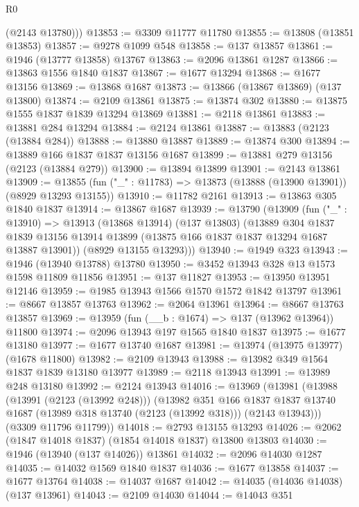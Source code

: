 \begin{lexlean}{R0}
\begin{coremodule}
        (@2143 @13780)))
@13853 := @3309 @11777 @11780
@13855 := @13808 (@13851 @13853)
@13857 := @9278 @1099 @548
@13858 := @137 @13857
@13861 := @1946 (@13777 @13858) @13767
@13863 := @2096 @13861 @1287
@13866 := @13863 @1556 @1840 @1837
@13867 := @1677 @13294
@13868 := @1677 @13156
@13869 := @13868 @1687
@13873 := @13866 (@13867 @13869) (@137 @13800)
@13874 := @2109 @13861
@13875 := @13874 @302
@13880 := @13875 @1555 @1837 @1839 @13294 @13869
@13881 := @2118 @13861
@13883 := @13881 @284 @13294
@13884 := @2124 @13861
@13887 := @13883 (@2123 (@13884 @284))
@13888 := @13880 @13887
@13889 := @13874 @300
@13894 := @13889 @166 @1837 @1837 @13156 @1687
@13899 := @13881 @279 @13156 (@2123 (@13884 @279))
@13900 := @13894 @13899
@13901 := @2143 @13861
@13909 := @13855 (fun ("_" : @11783) => @13873 (@13888 (@13900 @13901)) (@8929 @13293 @13155))
@13910 := @11782 @2161
@13913 := @13863 @305 @1840 @1837
@13914 := @13867 @1687
@13939 := @13790
    (@13909
      (fun ("_" : @13910) =>
      @13913
        (@13868 @13914)
        (@137 @13803)
        (@13889
          @304
          @1837
          @1839
          @13156
          @13914
          @13899
          (@13875 @166 @1837 @1837 @13294 @1687 @13887 @13901))
        (@8929 @13155 @13293)))
@13940 := @1949 @323
@13943 := @1946 (@13940 @13788) @13780
@13950 := @3452 @13943 @328 @13 @1573 @1598 @11809 @11856
@13951 := @137 @11827
@13953 := @13950 @13951 @12146
@13959 := @1985 @13943 @1566 @1570 @1572 @1842 @13797
@13961 := @8667 @13857 @13763
@13962 := @2064 @13961
@13964 := @8667 @13763 @13857
@13969 := @13959 (fun (__b : @1674) => @137 (@13962 @13964)) @11800
@13974 := @2096 @13943 @197 @1565 @1840 @1837
@13975 := @1677 @13180
@13977 := @1677 @13740 @1687
@13981 := @13974 (@13975 @13977) (@1678 @11800)
@13982 := @2109 @13943
@13988 := @13982 @349 @1564 @1837 @1839 @13180 @13977
@13989 := @2118 @13943
@13991 := @13989 @248 @13180
@13992 := @2124 @13943
@14016 := @13969
    (@13981
      (@13988
        (@13991 (@2123 (@13992 @248)))
        (@13982
          @351
          @166
          @1837
          @1837
          @13740
          @1687
          (@13989 @318 @13740 (@2123 (@13992 @318)))
          (@2143 @13943)))
      (@3309 @11796 @11799))
@14018 := @2793 @13155 @13293
@14026 := @2062 (@1847 @14018 @1837) (@1854 @14018 @1837) @13800 @13803
@14030 := @1946 (@13940 (@137 @14026)) @13861
@14032 := @2096 @14030 @1287
@14035 := @14032 @1569 @1840 @1837
@14036 := @1677 @13858
@14037 := @1677 @13764
@14038 := @14037 @1687
@14042 := @14035 (@14036 @14038) (@137 @13961)
@14043 := @2109 @14030
@14044 := @14043 @351

\end{coremodule}
\end{lexlean}
